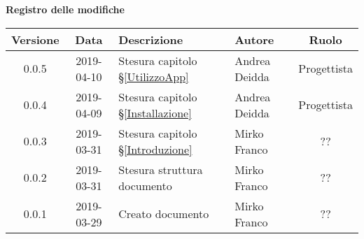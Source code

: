 	\begin{center}
		\textbf{Registro delle modifiche}
	\end{center}
	\begin{center}
		\begin{tabularx}{\textwidth}{|c|c|X|X|c|}
			\hline
			\textbf{Versione} & \textbf{Data} & \textbf{Descrizione} & \textbf{Autore} & \textbf{Ruolo} \\
			\hline
			0.0.5 & 2019-04-10 & Stesura capitolo \S\ref{UtilizzoApp} & Andrea Deidda & Progettista \\
			\hline
			0.0.4 & 2019-04-09 & Stesura capitolo \S\ref{Installazione} & Andrea Deidda & Progettista \\
			\hline
			0.0.3 & 2019-03-31 & Stesura capitolo \S\ref{Introduzione} & Mirko Franco & ?? \\
			\hline
			0.0.2 & 2019-03-31 & Stesura struttura documento & Mirko Franco & ?? \\
			\hline
			0.0.1 & 2019-03-29 & Creato documento & Mirko Franco & ?? \\
			\hline
		\end{tabularx}
	\end{center}
\newpage